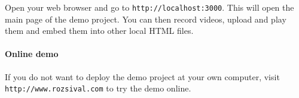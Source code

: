 Open your web browser and go to \verb|http://localhost:3000|. This will open the main page of the demo project. You can then record videos, upload and play them and embed them into other local HTML files.

\paragraph{Online demo}
If you do not want to deploy the demo project at your own computer, visit \verb|http://www.rozsival.com| to try the demo online.